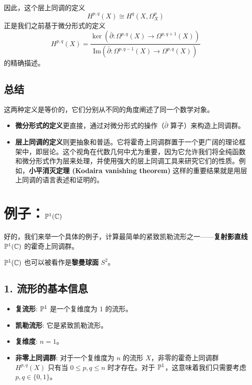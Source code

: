 \documentclass{amsart}
\let\originalmathbb\mathbb
\renewcommand{\mathbb}[1]{%
    \ifstrequal{#1}{1}{\mathbbm{#1}}{\originalmathbb{#1}}%
}
\theoremstyle{plain}
\theoremstyle{definition}
\theoremstyle{remark}
\begin{document}
因此，这个层上同调的定义
\[
H^{p,q}(X) \cong H^q(X, \Omega^p_X)
\]正是我们之前基于微分形式的定义\[
H^{p,q}(X) = \frac{\ker(\bar{\partial}: \Omega^{p,q}(X) \to \Omega^{p,q+1}(X))}{\mathrm{Im}(\bar{\partial}: \Omega^{p,q-1}(X) \to \Omega^{p,q}(X))}
\]
的精确描述。

\subsection{总结}

这两种定义是等价的，它们分别从不同的角度阐述了同一个数学对象。

\begin{itemize}
	\item \textbf{微分形式的定义}更直接，通过对微分形式的操作（$\bar{\partial}$ 算子）来构造上同调群。
	\item \textbf{层上同调的定义}则更抽象和普适。它将霍奇上同调群置于一个更广阔的理论框架中，即层论。这个视角在代数几何中尤为重要，因为它允许我们将全纯函数和微分形式作为层来处理，并使用强大的层上同调工具来研究它们的性质。例如，\textbf{小平消灭定理 (Kodaira vanishing theorem)} 这样的重要结果就是用层上同调的语言表述和证明的。
\end{itemize}

\section{例子：\texorpdfstring{$\mathbb{P}^{1}(\mathbb{C})$}{P^1(C)}}

好的，我们来举一个具体的例子，计算最简单的紧致凯勒流形之一——\textbf{复射影直线} $\mathbb{P}^1(\mathbb{C})$ 的霍奇上同调群。

$\mathbb{P}^1(\mathbb{C})$ 也可以被看作是\textbf{黎曼球面} $S^2$。

\subsection{1. 流形的基本信息}

\begin{itemize}
	\item \textbf{复流形}: $\mathbb{P}^1$ 是一个复维度为 1 的流形。
	\item \textbf{凯勒流形}: 它是紧致凯勒流形。
	\item \textbf{复维度}: $n=1$。
	\item \textbf{非零上同调群}: 对于一个复维度为 $n$ 的流形 $X$，非零的霍奇上同调群 $H^{p,q}(X)$ 只有当 $0 \le p, q \le n$ 时才存在。对于 $\mathbb{P}^1$，这意味着我们只需要考虑 $p, q \in \{0, 1\}$。
\end{itemize}
\end{document}
